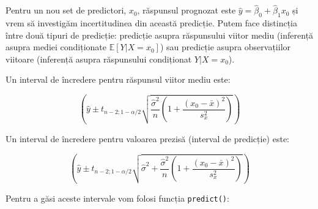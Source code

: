 \documentclass[]{article}
\begin{document}
Pentru un nou set de predictori, \(x_0\), răspunsul prognozat este
\(\hat{y} = \hat{\beta}_0+\hat{\beta}_1 x_0\) și vrem să investigăm
incertitudinea din această predicție. Putem face distincția între două
tipuri de predicție: predicție asupra răspunsului viitor mediu
(inferență asupra mediei condiționate \(\mathbb{E}[Y|X=x_0]\)) sau
predicție asupra observațiilor viitoare (inferență asupra răspunsului
condiționat \(Y|X=x_0\)).

Un interval de încredere pentru răspunsul viitor mediu este:

\[
\left(\hat y \pm t_{n-2;1-\alpha/2}\sqrt{\frac{\hat\sigma^2}{n}\left(1+\frac{(x_0-\bar x)^2}{s_x^2}\right)}\right)
\]

Un interval de încredere pentru valoarea prezisă (interval de predicție)
este:

\[
\left(\hat y \pm t_{n-2;1-\alpha/2}\sqrt{\hat\sigma^2+\frac{\hat\sigma^2}{n}\left(1+\frac{(x_0-\bar x)^2}{s_x^2}\right)}\right)
\]

Pentru a găsi aceste intervale vom folosi funcția \texttt{predict()}:
\end{document}
